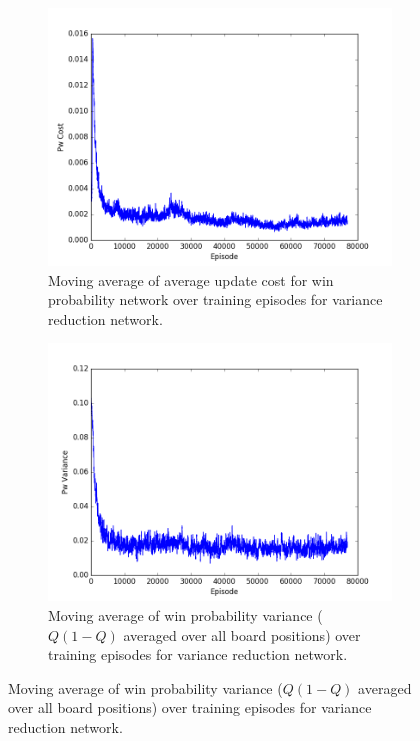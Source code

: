 \documentclass{article}
\begin{document}
\begin{figure}[!ht]
\centering
\begin{subfigure}[t]{.45\textwidth}
  \centering
      \includegraphics[width=1\textwidth]{pics/5x5_exp_Pw_cost.png}
  \caption{Moving average of average update cost for win probability network over training episodes for variance reduction network.}
  \label{fig:exp_Pw_cost}
\end{subfigure}\hfill
\begin{subfigure}[t]{.45\textwidth}
  \centering
      \includegraphics[width=1\textwidth]{pics/5x5_exp_Pw_var.png}
  \caption{Moving average of win probability variance ($Q(1-Q)$ averaged over all board positions) over training episodes for variance reduction network.}

\end{subfigure}
\end{figure}
\end{document}
